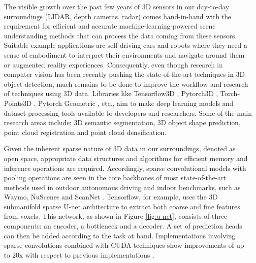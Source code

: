 The visible growth over the past few years of 3D sensors in our day-to-day surroundings (LIDAR, depth cameras, radar) comes hand-in-hand with the requirement for efficient and accurate machine-learning-powered scene understanding methods that can process the data coming from these sensors. Suitable example applications are self-driving cars and robots where they need a sense of embodiment to interpret their environments and navigate around them or augmented reality experiences. Consequently, even though research in computer vision has been recently pushing the state-of-the-art techniques in 3D object detection, much remains to be done to improve the workflow and research of techniques using 3D data. Libraries like Tensorflow3D \cite{najibi2020dops}, Pytorch3D \cite{ravi2020pytorch3d}, Torch-Points3D \cite{tp3d}, Pytorch Geometric \cite{Fey/Lenssen/2019}, etc., aim to make deep learning models and dataset processing tools available to developers and researchers. Some of the main research areas include: 3D semantic segmentation, 3D object shape prediction, point cloud registration and point cloud densification.





Given the inherent sparse nature of 3D data in our surroundings, denoted as open space, appropriate data structures and algorithms for efficient memory and inference operations are required. Accordingly, sparse convolutional models with pooling operations are seen in the core backbones of most state-of-the-art methods used in outdoor autonomous driving and indoor benchmarks, such as Waymo, NuScenes and ScanNet \cite{najibi2020dops}.
Tensorflow, for example, uses the 3D submanifold sparse U-net architecture to extract both coarse and fine features from voxels. This network, as shown in Figure \ref{fig:u-net}, consists of three components: an encoder, a bottleneck and a decoder. A set of prediction heads can then be added according to the task at hand. Implementations involving sparse convolutions combined with CUDA techniques show improvements of up to 20x with respect to previous implementations \cite{najibi2020dops}.

